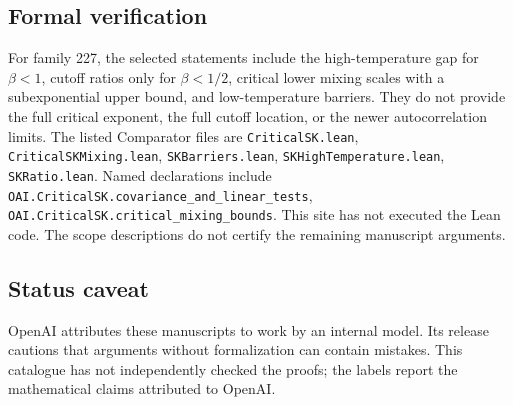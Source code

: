\documentclass[11pt]{article}
\begin{document}
\subsection{Formal verification}
For family 227, the selected statements include the high-temperature gap for $\beta<1$, cutoff ratios only for $\beta<1/2$, critical lower mixing scales with a subexponential upper bound, and low-temperature barriers. They do not provide the full critical exponent, the full cutoff location, or the newer autocorrelation limits. The listed Comparator files are \texttt{CriticalSK.lean}, \texttt{CriticalSKMixing.lean}, \texttt{SKBarriers.lean}, \texttt{SKHighTemperature.lean}, \texttt{SKRatio.lean}. Named declarations include \texttt{OAI.CriticalSK.covariance\_and\_linear\_tests}, \texttt{OAI.CriticalSK.critical\_mixing\_bounds}. This site has not executed the Lean code. The scope descriptions do not certify the remaining manuscript arguments.

\subsection{Status caveat}
OpenAI attributes these manuscripts to work by an internal model. Its release cautions that arguments without formalization can contain mistakes. This catalogue has not independently checked the proofs; the labels report the mathematical claims attributed to OpenAI.
\end{document}
